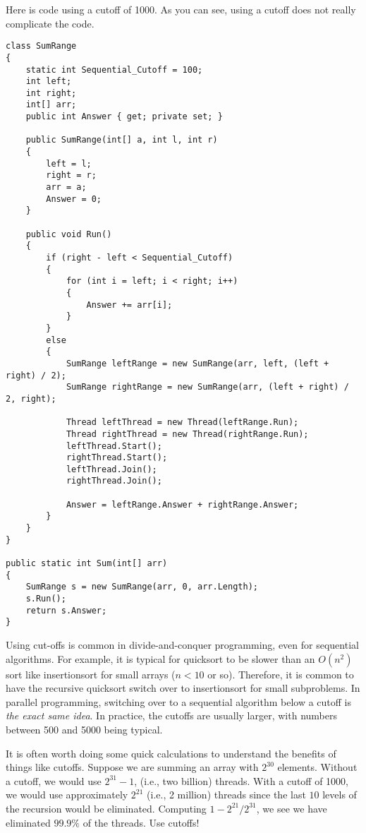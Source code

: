 \documentclass[10pt]{article}
\begin{document}
Here is code using a cutoff of 1000.  As you can see, using a cutoff
does not really complicate the code.
\begin{verbatim}
class SumRange
{
    static int Sequential_Cutoff = 100;
    int left;
    int right;
    int[] arr;
    public int Answer { get; private set; }

    public SumRange(int[] a, int l, int r)
    {
        left = l;
        right = r;
        arr = a;
        Answer = 0;
    }

    public void Run()
    {
        if (right - left < Sequential_Cutoff)
        {
            for (int i = left; i < right; i++)
            {
                Answer += arr[i];
            }
        }
        else
        {
            SumRange leftRange = new SumRange(arr, left, (left + right) / 2);
            SumRange rightRange = new SumRange(arr, (left + right) / 2, right);

            Thread leftThread = new Thread(leftRange.Run);
            Thread rightThread = new Thread(rightRange.Run);
            leftThread.Start();
            rightThread.Start();
            leftThread.Join();
            rightThread.Join();

            Answer = leftRange.Answer + rightRange.Answer;
        }
    }
}

public static int Sum(int[] arr)
{
    SumRange s = new SumRange(arr, 0, arr.Length);
    s.Run();
    return s.Answer;
}
\end{verbatim}

Using cut-offs is common in divide-and-conquer programming, even for
sequential algorithms.  For example, it is typical for quicksort to be
slower than an $O(n^2)$ sort like insertionsort for small arrays
($n < 10$ or so).  Therefore, it is common to have the recursive
quicksort switch over to insertionsort for small subproblems.  In
parallel programming, switching over to a sequential algorithm below a
cutoff is \emph{the exact same idea}.  In practice, the cutoffs are
usually larger, with numbers between 500 and 5000 being typical.

It is often worth doing some quick calculations to understand the
benefits of things like cutoffs.  Suppose we are summing an array with
$2^{30}$ elements.  Without a cutoff, we would use $2^{31}-1$, (i.e.,
two billion) threads.  With a cutoff of 1000, we would use
approximately $2^{21}$ (i.e., 2 million) threads since the last $10$
levels of the recursion would be eliminated.  Computing
$1-2^{21}/2^{31}$, we see we have eliminated $99.9\%$ of the threads.
Use cutoffs!
\end{document}

